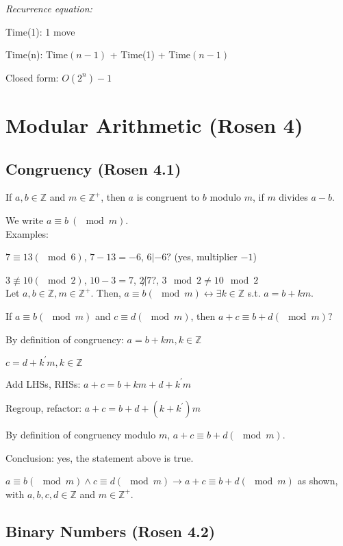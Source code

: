 \documentclass[english,openany]{book}
\begin{document}
    \textit{Recurrence equation:}

    Time(1): 1 move

    Time(n): Time$(n-1)$ + Time(1) + Time$(n-1)$

    Closed form: $O(2^n) - 1$

    \chapter{Modular Arithmetic (Rosen 4)}

    \section{Congruency (Rosen 4.1)}

    If $a, b \in \mathbb Z$ and $m \in \mathbb Z^+$, then $a$ is congruent to $b$ modulo $m$, if $m$ divides $a-b$.

    We write $a \equiv b\ (\mod m)$.\\

    Examples:

    $7 \equiv 13 (\mod 6)$, $7 - 13 = -6$, $6 | -6 ?$ (yes, multiplier $-1$)

    $3 \not\equiv 10 (\mod 2)$, $10 - 3 = 7$, $2 \not| 7 ?$, $3 \mod 2 \neq 10 \mod 2$\\

    Let $a,b \in \mathbb Z, m \in \mathbb Z^+$. Then, $a \equiv b (\mod m) \leftrightarrow \exists k \in \mathbb Z$ s.t. $a = b + km$.

    If $a \equiv b (\mod m)$ and $c \equiv d (\mod m)$, then $a + c \equiv b + d (\mod m) ?$

    By definition of congruency: $a = b + km, k \in \mathbb Z$

    $c = d + k^{'} m, k \in \mathbb Z$

    Add LHSs, RHSs: $a+c = b + km + d + k^{'} m$

    Regroup, refactor: $a + c = b + d + (k + k^{'})m$

    By definition of congruency modulo $m$, $a + c \equiv b + d (\mod m)$.

    Conclusion: yes, the statement above is true.

    $a \equiv b (\mod m) \wedge c \equiv d (\mod m) \rightarrow a + c \equiv b + d (\mod m)$ as shown, with $a,b,c,d \in \mathbb Z$ and $m \in \mathbb Z^+$.

    \section{Binary Numbers (Rosen 4.2)}
\end{document}
